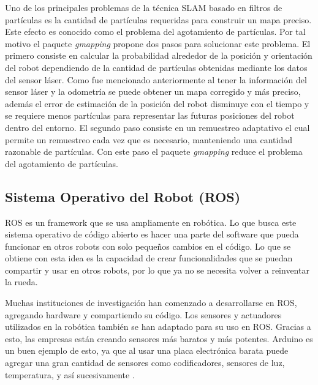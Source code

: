 Uno de los principales problemas de la técnica SLAM basado en filtros de partículas es la cantidad 
de partículas requeridas para construir un mapa preciso. Este efecto es conocido como el 
problema del agotamiento de partículas. Por tal motivo el paquete \textit{gmapping} propone 
dos pasos para solucionar este problema. El primero consiste en calcular la probabilidad 
alrededor de la posición y orientación del robot dependiendo de la cantidad de partículas 
obtenidas mediante los datos del sensor láser. Como fue mencionado anteriormente al tener 
la información del sensor láser y la odometría se puede obtener un mapa corregido y más 
preciso, además el error de estimación de la posición del robot disminuye con el tiempo y 
se requiere menos partículas para representar las futuras posiciones del robot dentro del 
entorno. El segundo paso consiste en un remuestreo adaptativo el cual permite un remuestreo 
cada vez que es necesario, manteniendo una cantidad razonable de partículas. Con este paso 
el paquete \textit{gmapping} reduce el problema del agotamiento de partículas.




\subsection{Sistema Operativo del Robot (ROS)}
ROS es un framework que se usa ampliamente en robótica. Lo que busca este sistema 
operativo de código abierto es hacer una parte del software que pueda funcionar en 
otros robots con solo pequeños cambios en el código. Lo que se obtiene con esta idea 
es la capacidad de crear funcionalidades que se puedan compartir y usar en otros robots, por 
lo que ya no se necesita volver a reinventar la rueda.

Muchas instituciones de investigación han comenzado a desarrollarse en 
ROS, agregando hardware y compartiendo su código. Los sensores y actuadores 
utilizados en la robótica también se han adaptado para su uso en ROS. Gracias 
a esto, las empresas están creando sensores más baratos y más potentes. Arduino 
es un buen ejemplo de esto, ya que al usar una placa electrónica barata puede 
agregar una gran cantidad de sensores como codificadores, sensores de luz, 
temperatura, y así sucesivamente \cite{rosIntroduction}.

